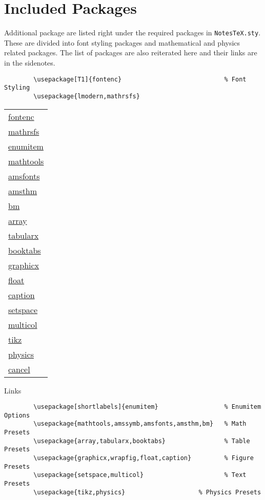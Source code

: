 \documentclass[10pt]{article}
\begin{document}
\section{Included Packages} %
\label{sec:incpackage}
Additional package are listed right under the required packages in \texttt{NotesTeX.sty}. These are divided into font styling packages and mathematical and physics related packages. The list of packages are also reiterated here and their links are in the sidenotes.
\begin{verbatim}
		\usepackage[T1]{fontenc}                            % Font Styling
		\usepackage{lmodern,mathrsfs}
	\end{verbatim}
\begin{margintable}\footnotesize{}
	\begin{tabularx}{\marginparwidth}{|X}
		\href{https://www.ctan.org/pkg/fontenc}{fontenc}     \\
		\href{https://www.ctan.org/pkg/mathrsfs}{mathrsfs}   \\
		\href{https://www.ctan.org/pkg/enumitem}{enumitem}   \\
		\href{https://www.ctan.org/pkg/mathtools}{mathtools} \\
		\href{https://www.ctan.org/pkg/amsfonts}{amsfonts}   \\
		\href{https://www.ctan.org/pkg/amsthm}{amsthm}       \\
		\href{https://www.ctan.org/pkg/bm}{bm}               \\
		\href{https://www.ctan.org/pkg/array}{array}         \\
		\href{https://www.ctan.org/pkg/tabularx}{tabularx}   \\
		\href{https://www.ctan.org/pkg/booktabs}{booktabs}   \\
		\href{https://www.ctan.org/pkg/graphicx}{graphicx}   \\
		\href{https://www.ctan.org/pkg/float}{float}         \\
		\href{https://www.ctan.org/pkg/caption}{caption}     \\
		\href{https://www.ctan.org/pkg/setspace}{setspace}   \\
		\href{https://www.ctan.org/pkg/multicol}{multicol}   \\
		\href{https://www.ctan.org/topic/pgf-tikz}{tikz}     \\ %
		\href{https://www.ctan.org/pkg/physics}{physics}     \\
		\href{https://www.ctan.org/pkg/cancel}{cancel}
	\end{tabularx}
	\caption{Links}
\end{margintable}
\begin{verbatim}
		\usepackage[shortlabels]{enumitem}                  % Enumitem Options
		\usepackage{mathtools,amssymb,amsfonts,amsthm,bm}   % Math Presets
		\usepackage{array,tabularx,booktabs}                % Table Presets
		\usepackage{graphicx,wrapfig,float,caption}         % Figure Presets
		\usepackage{setspace,multicol}                      % Text Presets
		\usepackage{tikz,physics}                    % Physics Presets
	\end{verbatim}
\end{document}
